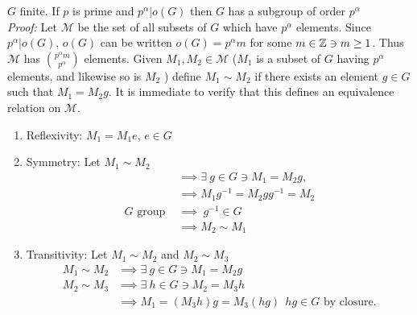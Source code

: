\begin{theorem}
$G$ finite. If $p$ is prime and $p^\alpha|o(G)$ then $G$ has a subgroup of order $p^\alpha$ \steezybreak\\
\textit{Proof:}
Let $\mathcal{M}$ be the set of all subsets of $G$ which have $p^\alpha$ elements. Since $p^\alpha | o(G)$, $o(G)$ can be written $o(G)=p^\alpha m$ for some $m\in {\mathbb{ Z}} \ni m \geq 1$. Thus $\mathcal{M}$ has ${p^\alpha m \choose p^\alpha}$ elements. Given $M_1 , M_2 \in \mathcal{M}$ ($M_1$ is a subset of $G$ having $p^\alpha$ elements, and likewise so is $M_2$ ) define $M_1 \sim M_2$ if there exists an element $g \in G$ such that $M_1 = M_2g$. It is immediate to verify that this defines an equivalence relation on $\mathcal{M}$.
\begin{enumerate}[label=\roman*)]
    \item Reflexivity: $M_1=M_1e$, $e\in G$
    \item Symmetry: Let $M_1\sim M_2 $
    \begin{align}
        &\implies \exists \ g\in G \ni M_1=M_2g, \nonumber \\
        &\implies M_1g^{-1} = M_2gg^{-1}=M_2 \nonumber \\
        G \text{ group } &\implies \ g^{-1}\in G \nonumber \\
        &\implies M_2\sim M_1 \nonumber 
    \end{align}
    \item Transitivity: Let $M_1\sim M_2$ and $M_2\sim M_3$
    \begin{align}
        M_1\sim M_2 &\implies \exists \ g \in G \ni M_1= M_2g \nonumber \\
        M_2\sim M_3 &\implies \exists \ h \in G \ni M_2= M_3h \nonumber \\
        &\implies M_1 = (M_3h)g = M_3(hg) \ \  hg\in G \text{ by closure.} \nonumber
    \end{align}
\end{enumerate}



\end{theorem}
